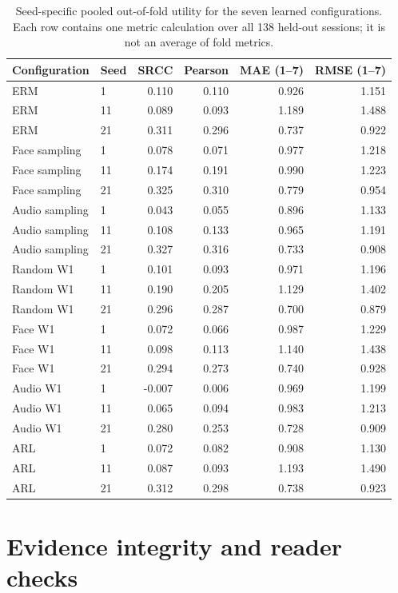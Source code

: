 \begin{table}[H]
\centering
\caption{Seed-specific pooled out-of-fold utility for the seven learned configurations. Each row
contains one metric calculation over all 138 held-out sessions; it is not an average of fold
metrics.}
\label{tab:stage-a-seeds}
\small
\renewcommand{\arraystretch}{1.05}
\begin{tabular}{llrrrr}
\toprule
Configuration & Seed & SRCC & Pearson & MAE (1--7) & RMSE (1--7) \\
\midrule
ERM & 1 & 0.110 & 0.110 & 0.926 & 1.151 \\
ERM & 11 & 0.089 & 0.093 & 1.189 & 1.488 \\
ERM & 21 & 0.311 & 0.296 & 0.737 & 0.922 \\
Face sampling & 1 & 0.078 & 0.071 & 0.977 & 1.218 \\
Face sampling & 11 & 0.174 & 0.191 & 0.990 & 1.223 \\
Face sampling & 21 & 0.325 & 0.310 & 0.779 & 0.954 \\
Audio sampling & 1 & 0.043 & 0.055 & 0.896 & 1.133 \\
Audio sampling & 11 & 0.108 & 0.133 & 0.965 & 1.191 \\
Audio sampling & 21 & 0.327 & 0.316 & 0.733 & 0.908 \\
Random W1 & 1 & 0.101 & 0.093 & 0.971 & 1.196 \\
Random W1 & 11 & 0.190 & 0.205 & 1.129 & 1.402 \\
Random W1 & 21 & 0.296 & 0.287 & 0.700 & 0.879 \\
Face W1 & 1 & 0.072 & 0.066 & 0.987 & 1.229 \\
Face W1 & 11 & 0.098 & 0.113 & 1.140 & 1.438 \\
Face W1 & 21 & 0.294 & 0.273 & 0.740 & 0.928 \\
Audio W1 & 1 & -0.007 & 0.006 & 0.969 & 1.199 \\
Audio W1 & 11 & 0.065 & 0.094 & 0.983 & 1.213 \\
Audio W1 & 21 & 0.280 & 0.253 & 0.728 & 0.909 \\
ARL & 1 & 0.072 & 0.082 & 0.908 & 1.130 \\
ARL & 11 & 0.087 & 0.093 & 1.193 & 1.490 \\
ARL & 21 & 0.312 & 0.298 & 0.738 & 0.923 \\
\bottomrule
\end{tabular}
\end{table}

\section{Evidence integrity and reader checks}

